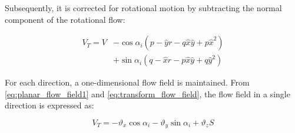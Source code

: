 Subsequently, it is corrected for rotational motion by subtracting the normal component of the rotational flow:

\begin{equation}
\begin{aligned}
{V_T} = V &- \cos {\alpha _i}\left( {p - \hat yr - q\hat x\hat y + p{{\hat x}^2}} \right) \\~&+ \sin {\alpha _i}\left( {q - \hat xr - p\hat x\hat y + q{{\hat y}^2}} \right)
\end{aligned}
\end{equation}

For each direction, a one-dimensional flow field is maintained. From \cref{eq:planar_flow_field1} and \cref{eq:transform_flow_field}, the flow field in a single direction is expressed as:

\begin{equation}
\label{eq:flow_field_line}
V_T =  - {\vartheta _x}\cos \alpha_i  - {\vartheta _y}\sin \alpha_i  + {\vartheta _z}S
\end{equation}

